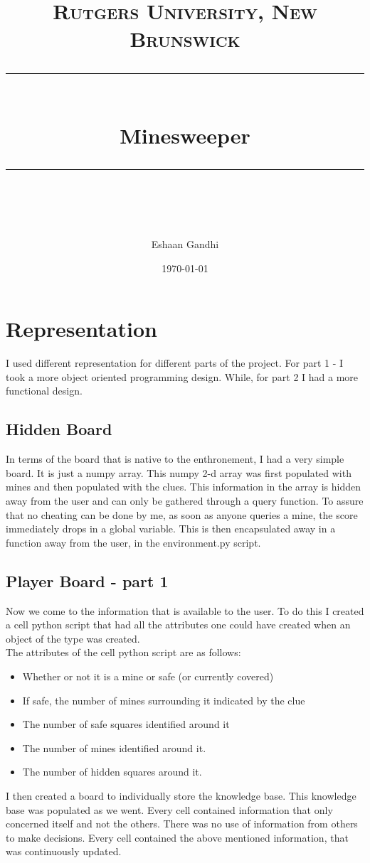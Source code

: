 \documentclass[11pt]{scrartcl} %
\title{	
	\normalfont\normalsize
	\textsc{Rutgers University, New Brunswick}\\ %
	\vspace{25pt} %
	\rule{\linewidth}{0.5pt}\\ %
	\vspace{20pt} %
	{\huge Minesweeper}\\ %
	\vspace{12pt} %
	\rule{\linewidth}{2pt}\\ %
	\vspace{12pt} %
}
\author{\LARGE Eshaan Gandhi} %
\date{\normalsize\today} %
\begin{document}
\maketitle %

\section{Representation}
I used different representation for different parts of the project.
For part 1 - I took a more object oriented programming design. While, for part 2 I had a more functional design. 
\subsection{Hidden Board}
In terms of the board that is native to the enthronement, I had a very simple board. It is just a numpy array. This numpy 2-d array was first populated with mines and then populated with the clues. This information in the array is hidden away from the user and can only be gathered through a query function. To assure that no cheating can be done by me, as soon as anyone queries a mine, the score immediately drops in a global variable. This is then encapsulated away in a function away from the user, in the environment.py script. 

\subsection{Player Board - part 1}
Now we come to the information that is available to the user. To do this I created a cell python script that had all the attributes one could have created when an object of the type was created. \\
The attributes of the cell python script are as follows:
\begin{itemize}[leftmargin = *]
\item Whether or not it is a mine or safe (or currently covered)
\item If safe, the number of mines surrounding it indicated by the clue
\item The number of safe squares identified around it
\item The number of mines identified around it.
\item The number of hidden squares around it.
\end{itemize}

I then created a board to individually store the knowledge base. This knowledge base was populated as we went. Every cell contained information that only concerned itself and not the others. There was no use of information from others to make decisions. Every cell contained the above mentioned information, that was continuously updated. 
\end{document}
